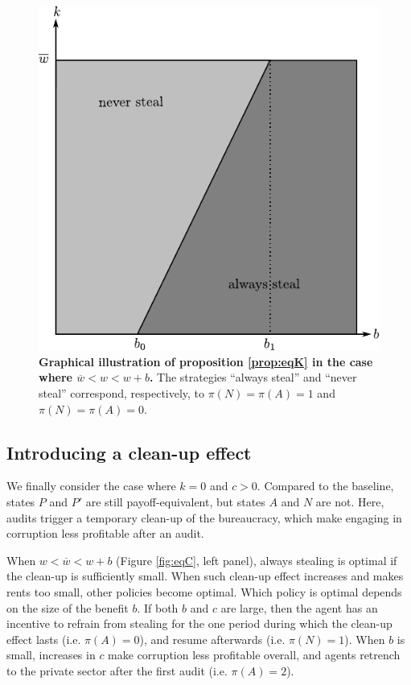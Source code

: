 \documentclass[12pt,a4paper]{article}
\theoremstyle{definition}
\newcommand{\wb}{\overline{w}}
\begin{document}
{\begin{figure}[H]
    \centering
    \includegraphics{figures_theory/eq_with_k.pdf}
    \caption{{\bf Graphical illustration of proposition \ref{prop:eqK} in the case where $\wb < w < w+b$.} The strategies ``always steal'' and ``never steal'' correspond, respectively, to $\pi(N) = \pi(A) = 1$ and $\pi(N) = \pi(A) = 0$.}
    \label{fig:eqK}
\end{figure}

\subsection{Introducing a clean-up effect}

We finally consider the case where $k = 0$ and $c > 0$. Compared to the baseline, states $P$ and $P'$ are still payoff-equivalent, but states $A$ and $N$ are not. Here, audits trigger a temporary clean-up of the bureaucracy, which make engaging in corruption less profitable after an audit. 

When $w < \wb < w+b$ (Figure \ref{fig:eqC}, left panel), always stealing is optimal if the clean-up is sufficiently small. When such clean-up effect increases and makes rents too small, other policies become optimal. Which policy is optimal depends on the size of the benefit $b$. If both $b$ and $c$ are large, then the agent has an incentive to refrain from stealing for the one period during which the clean-up effect lasts (i.e. $\pi(A) = 0$), and resume afterwards (i.e. $\pi(N) = 1$). When $b$ is small, increases in $c$ make corruption less profitable overall, and agents retrench to the private sector after the first audit (i.e. $\pi(A) = 2$). 

}
\end{document}
